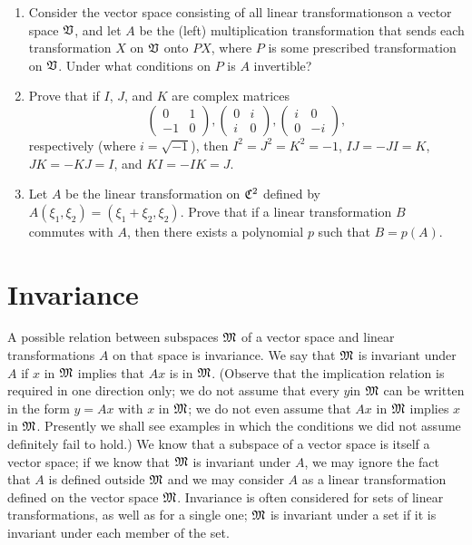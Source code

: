 {\begin{enumerate}[wide]
    \item Consider the vector space consisting of all linear transformationson a vector space \(\mathfrak{V}\), and let \(A\) be the (left) multiplication transformation that sends each transformation \(X\) on \(\mathfrak{V}\) onto \(PX\), where \(P\) is some prescribed transformation on \(\mathfrak{V}\). Under what conditions on \(P\) is \(A\) invertible?
    
    \item Prove that if \(I\), \(J\), and \(K\) are complex matrices
    \begin{equation*}
        \begin{pmatrix}
            0 & 1 \\ -1 & 0
        \end{pmatrix}, \begin{pmatrix}
            0 & i \\ i & 0
        \end{pmatrix}, \begin{pmatrix}
            i & 0 \\ 0 & -i
        \end{pmatrix},
    \end{equation*}
    respectively (where \(i = \sqrt{-1}\)), then \(I^2 = J^2 = K^2 = -1\), \(IJ = -JI = K\), \(JK = -KJ = I\), and \(KI = -IK = J\).

    \item Let \(A\) be the linear transformation on \(\mathfrak{C}^2\) defined by \(A(\xi_1, \xi_2) = (\xi_1 + \xi_2, \xi_2)\). Prove that if a linear transformation \(B\) commutes with \(A\), then there exists a polynomial \(p\) such that \(B = p(A)\).
    

\end{enumerate}

}

\section{Invariance}

A possible relation between subspaces \(\frak{M}\) of a vector space and linear
transformations \(A\) on that space is invariance. We say that \(\frak{M}\) is
invariant under \(A\) if \(x\) in \(\frak{M}\) implies that \(Ax\) is in
\(\frak{M}\). (Observe that the implication relation is required in one
direction only; we do not assume that every \(y\)in \(\frak{M}\) can be written
in the form \(y = Ax\) with \(x\) in \(\frak{M}\); we do not even assume that
\(Ax\) in \(\frak{M}\) implies \(x\) in \(\frak{M}\). Presently we shall see
examples in which the conditions we did not assume definitely fail to hold.) We
know that a subspace of a vector space is itself a vector space; if we know that
\(\frak{M}\) is invariant under \(A\), we may ignore the fact that \(A\) is
defined outside \(\frak{M}\) and we may consider \(A\) as a linear
transformation defined on the vector space \(\frak{M}\). Invariance is often
considered for sets of linear transformations, as well as for a single one;
\(\frak{M}\) is invariant under a set if it is invariant under each member of
the set.


